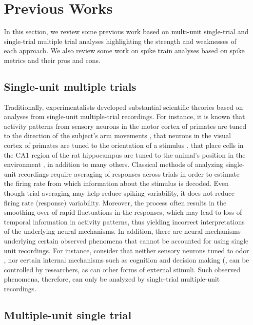 
\section{Previous Works}
In this section, we review some previous work based on multi-unit single-trial
and single-trial multiple trial analyses highlighting the strength and
weaknesses of each approach.
We also review some work on spike train analyses based on spike metrics
and their pros and cons.

\subsection{Single-unit multiple trials}

Traditionally, experimentalists developed substantial scientific theories based on analyses from single-unit multiple-trial recordings. For instance, it is known that activity patterns from sensory neurons in the motor cortex of primates are tuned to the direction of the subject's arm movements \cite{Georgopoulos1982}, that neurons in the visual cortex of primates are tuned to the orientation of a stimulus \cite{Hubel1968}, that place cells in the CA1 region of the rat hippocampus are tuned to the animal's position in the environment \cite{OKeefe1971}, in addition to many others.
Classical  methods of analyzing single-unit recordings require averaging of responses across trials in order to estimate the firing rate from which information about the stimulus is decoded. Even though trial averaging may help reduce spiking variability, it does not reduce firing rate (response) variability.
Moreover, the process often results in the smoothing over of rapid fluctuations in the 
responses, which may lead to loss of temporal information in activity patterns, thus yielding incorrect interpretations of the underlying neural mechanisms.
In addition, there are neural mechanisms underlying certain observed phenomena 
that cannot be accounted for using single unit recordings.
For instance, consider that neither sensory neurons tuned to odor \cite{Hopfield1995},
nor certain internal mechanisms such as cognition and decision making (\cite{Redish2016,
Vos2015, Kaufman2014, Mazor2005}, can be controlled by researchers, as can other forms of external stimuli. Such observed phenomena, therefore, can only be analyzed by single-trial multiple-unit recordings. 
\newpage



\subsection{Multiple-unit single trial}


